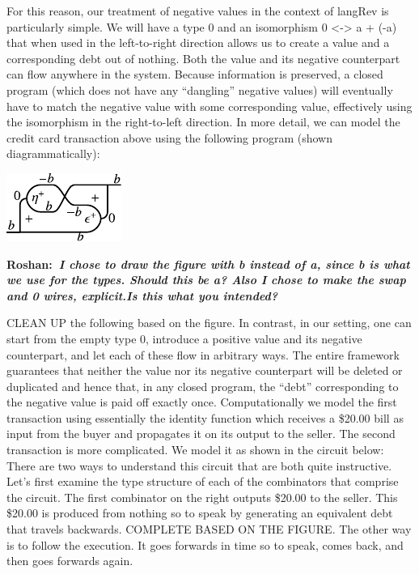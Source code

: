 \documentclass[preprint]{sigplanconf}
\newcommand{\xcomment}[2]{\textbf{#1:~\textsl{#2}}}
\newcommand{\roshan}[1]{\xcomment{Roshan}{#1}}
\begin{document}
For this reason, our treatment of negative values in the context of
{{langRev}} is particularly simple. We will have a type $0$ and an
isomorphism {{0 <-> a + (-a)}} that when used in the left-to-right direction
allows us to create a value and a corresponding debt out of nothing. Both the
value and its negative counterpart can flow anywhere in the system. Because
information is preserved, a closed program (which does not have any
``dangling'' negative values) will eventually have to match the negative
value with some corresponding value, effectively using the isomorphism in the
right-to-left direction. In more detail, we can model the credit card
transaction above using the following program (shown diagrammatically):

\begin{center}
  \includegraphics{diagrams/algebra1.pdf}
\end{center}

\roshan{I chose to draw the figure with b instead of a, since b is what
  we use for the types. Should this be a? Also I chose to make the
  swap and 0 wires, explicit.Is this what you intended? }

CLEAN UP the following based on the figure. In contrast, in our setting, one
can start from the empty type $0$, introduce a positive value and its
negative counterpart, and let each of these flow in arbitrary ways. The
entire framework guarantees that neither the value nor its negative
counterpart will be deleted or duplicated and hence that, in any closed
program, the ``debt'' corresponding to the negative value is paid off exactly
once. Computationally we model the first transaction using essentially the
identity function which receives a \$20.00 bill as input from the buyer and
propagates it on its output to the seller. The second transaction is more
complicated. We model it as shown in the circuit below: There are two ways to
understand this circuit that are both quite instructive. Let's first examine
the type structure of each of the combinators that comprise the circuit. The
first combinator on the right outputs \$20.00 to the seller. This \$20.00 is
produced from nothing so to speak by generating an equivalent debt that
travels backwards. COMPLETE BASED ON THE FIGURE. The other way is to follow
the execution. It goes forwards in time so to speak, comes back, and then goes
forwards again.
\end{document}
